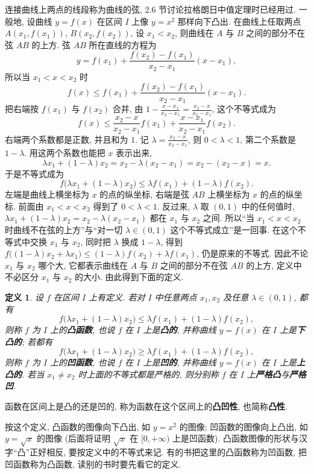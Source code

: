 \documentclass[UTF8,openany]{ctexbook}
\theoremstyle{chinesetextbook}
\newtheorem{definition}{定义}[section]
\begin{document}
连接曲线上两点的线段称为曲线的弦, 2.6 节讨论拉格朗日中值定理时已经用过. 一般地, 设曲线 $y=f(x)$ 在区间 $I$ 上像 $y=x^2$ 那样向下凸出. 在曲线上任取两点 $A(x_1,f(x_1))$, $B(x_2,f(x_2))$, 设 $x_1<x_2$, 则曲线在 $A$ 与 $B$ 之间的部分不在弦 $AB$ 的上方. 弦 $AB$ 所在直线的方程为
\[
y=f(x_1)+\frac{f(x_2)-f(x_1)}{x_2-x_1}(x-x_1),
\]
所以当 $x_1<x<x_2$ 时
\[
f(x)\le f(x_1)+\frac{f(x_2)-f(x_1)}{x_2-x_1}(x-x_1).
\]
把右端按 $f(x_1)$ 与 $f(x_2)$ 合并, 由 $\displaystyle1-\frac{x-x_1}{x_2-x_1}=\frac{x_2-x}{x_2-x_1}$, 这个不等式成为
\[
f(x)\le\frac{x_2-x}{x_2-x_1}f(x_1)+\frac{x-x_1}{x_2-x_1}f(x_2).
\]
右端两个系数都是正数, 并且和为 $1$. 记 $\displaystyle\lambda=\frac{x_2-x}{x_2-x_1}$, 则 $0<\lambda<1$, 第二个系数是 $1-\lambda$. 用这两个系数也能把 $x$ 表示出来,
\[
\lambda x_1+(1-\lambda)x_2=x_2-\lambda(x_2-x_1)=x_2-(x_2-x)=x.
\]
于是不等式成为
\[
f\bigl(\lambda x_1+(1-\lambda)x_2\bigr)\le\lambda f(x_1)+(1-\lambda)f(x_2).
\]
左端是曲线上横坐标为 $x$ 的点的纵坐标, 右端是弦 $AB$ 上横坐标为 $x$ 的点的纵坐标. 前面由 $x_1<x<x_2$ 得到了 $0<\lambda<1$. 反过来, $\lambda$ 取 $(0,1)$ 中的任何值时, $\lambda x_1+(1-\lambda)x_2=x_2-\lambda(x_2-x_1)$ 都在 $x_1$ 与 $x_2$ 之间. 所以“当 $x_1<x<x_2$ 时曲线不在弦的上方”与“对一切 $\lambda\in(0,1)$ 这个不等式成立”是一回事. 在这个不等式中交换 $x_1$ 与 $x_2$, 同时把 $\lambda$ 换成 $1-\lambda$, 得到 $f\bigl((1-\lambda)x_2+\lambda x_1\bigr)\le(1-\lambda)f(x_2)+\lambda f(x_1)$, 仍是原来的不等式. 因此不论 $x_1$ 与 $x_2$ 哪个大, 它都表示曲线在 $A$ 与 $B$ 之间的部分不在弦 $AB$ 的上方, 定义中不必区分 $x_1$ 与 $x_2$ 的大小. 由此得到下面的定义.
\begin{definition}\label{def:c2-10-convex}
设 $f$ 在区间 $I$ 上有定义. 若对 $I$ 中任意两点 $x_1,x_2$ 及任意 $\lambda\in(0,1)$, 都有
\[
f\bigl(\lambda x_1+(1-\lambda)x_2\bigr)\le\lambda f(x_1)+(1-\lambda)f(x_2),
\]
则称 $f$ 为 $I$ 上的\textbf{凸函数}, 也说 $f$ 在 $I$ 上是\textbf{凸的}, 并称曲线 $y=f(x)$ 在 $I$ 上是\textbf{下凸的}; 若都有
\[
f\bigl(\lambda x_1+(1-\lambda)x_2\bigr)\ge\lambda f(x_1)+(1-\lambda)f(x_2),
\]
则称 $f$ 为 $I$ 上的\textbf{凹函数}, 也说 $f$ 在 $I$ 上是\textbf{凹的}, 并称曲线 $y=f(x)$ 在 $I$ 上是\textbf{上凸的}. 若当 $x_1\ne x_2$ 时上面的不等式都是严格的, 则分别称 $f$ 在 $I$ 上\textbf{严格凸}与\textbf{严格凹}.
\end{definition}
函数在区间上是凸的还是凹的, 称为函数在这个区间上的\textbf{凸凹性}, 也简称\textbf{凸性}.

按这个定义, 凸函数的图像向下凸出, 如 $y=x^2$ 的图像; 凹函数的图像向上凸出, 如 $y=\sqrt x$ 的图像 (后面将证明 $\sqrt x$ 在 $[0,+\infty)$ 上是凹函数). 凸函数图像的形状与汉字“凸”正好相反, 要按定义中的不等式来记. 有的书把这里的凸函数称为凹函数, 把凹函数称为凸函数, 读别的书时要先看它的定义.
\end{document}
